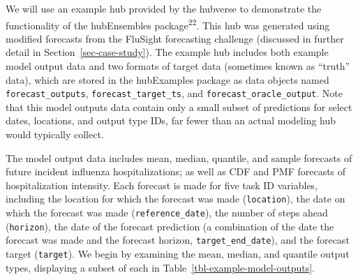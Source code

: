 \documentclass[
  letterpaper,
  DIV=11,
  numbers=noendperiod]{scrartcl}
\begin{document}
We will use an example hub provided by the hubverse to demonstrate the
functionality of the {hubEnsembles} package\textsuperscript{22}. This
hub was generated using modified forecasts from the FluSight forecasting
challenge (discussed in further detail in Section~\ref{sec-case-study}).
The example hub includes both example model output data and two formats
of target data (sometimes known as ``truth'' data), which are stored in
the {hubExamples} package as data objects named
\texttt{forecast\_outputs}, \texttt{forecast\_target\_ts}, and
\texttt{forecast\_oracle\_output}. Note that this model outputs data
contain only a small subset of predictions for select dates, locations,
and output type IDs, far fewer than an actual modeling hub would
typically collect.

The model output data includes mean, median, quantile, and sample
forecasts of future incident influenza hospitalizations; as well as CDF
and PMF forecasts of hospitalization intensity. Each forecast is made
for five task ID variables, including the location for which the
forecast was made (\texttt{location}), the date on which the forecast
was made (\texttt{reference\_date}), the number of steps ahead
(\texttt{horizon}), the date of the forecast prediction (a combination
of the date the forecast was made and the forecast horizon,
\texttt{target\_end\_date}), and the forecast target (\texttt{target}).
We begin by examining the mean, median, and quantile output types,
displaying a subset of each in Table~\ref{tbl-example-model-outputs}.
\end{document}

